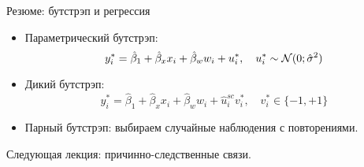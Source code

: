 \begin{frame}{Резюме: бутстрэп и регрессия}


\begin{itemize}[<+->]
\item Параметрический бутстрэп: 
\[
    y_i^* = \hat \beta_1 + \hat\beta_x x_i + \hat\beta_w w_i + u_i^*, \quad u_i^* \sim \mathcal{N}(0;\hat\sigma^2)
\]
\item Дикий бутстрэп: 
\[
    y_i^* = \hat \beta_1 + \hat\beta_x x_i + \hat\beta_w w_i + \hat u_i^{sc} v_i^*, \quad v_i^* \in \{-1, +1\}
\]
\item Парный бутстрэп: выбираем случайные наблюдения с повторениями.
\end{itemize}

\pause

\alert{Следующая лекция:} причинно-следственные связи.

\end{frame}
    